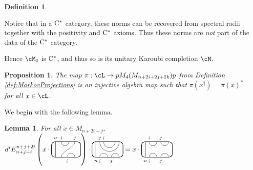 \documentclass[11pt]{article}
\theoremstyle{plain}
\newtheorem{lem}[thm]{Lemma}
\newtheorem{prop}[thm]{Proposition}
\theoremstyle{definition}
\newtheorem{defn}[thm]{Definition}
\newcommand{\Cstar}{\rm{C^*}}
\begin{document}
\begin{defn}
\begin{itemize}
{Notice that in a $\Cstar$ category, these norms can be recovered from spectral radii together with the positivity and $\Cstar$ axioms.
Thus these norms are \emph{not} part of the data of the $\Cstar$ category.
}
\end{itemize}
Hence $\cM_0$ is $\Cstar$, and thus so is its unitary Karoubi completion $\cM$.
\end{defn}


\begin{prop}
\label{prop:InjectiveAlgebraMap}
The map $\pi: \cL \to pM_4(M_{n+2i+2j+2k})p$ from Definition \ref{def:MarkovProjections} is an injective algebra map such that $\pi(x^\dag) = \pi(x)^*$ for all $x\in \cL$.
\end{prop}


We begin with the following lemma.

 \begin{lem}
 \label{lem:LeftKink}
For all $x \in M_{n+2i+j}$,
$
d^i
E^{n+j+2i}_{n+j+i}
\left(
x
\cdot
\begin{tikzpicture}[baseline = .3cm]
 \draw[thick, rounded corners = 5pt] (0,0) rectangle (1.5,.8);
 \draw (.2,0) -- (.2,.8);
 \draw (.5,.8) arc (-180:0:.2cm);
 \draw (.5,0) .. controls ++(90:.3cm) and ++(270:.3cm) .. (1.2,.8);
 \draw (.8,0) arc (180:0:.2cm);
 \node at (.2,1) {\scriptsize{$n$}};
 \node at (.5,1) {\scriptsize{$i$}};
 \node at (1.2,1) {\scriptsize{$j$}};
 \node at (.8,-.2) {\scriptsize{$i$}};
\end{tikzpicture}
\right)
\cdot
\begin{tikzpicture}[baseline=.3cm]
 \draw[thick, rounded corners = 5pt] (0,0) rectangle (1.6,.8);
 \draw (.2,0) -- (.2,.8);
 \draw (0.4,.8) arc (-180:0:.5);
 \draw (0.6,.8) arc (-180:0:.3);
 \draw (0.4,0) arc (180:0:.2);
 \draw (1,0) arc (180:0:.2);
 \node at (.2,-.2) {\scriptsize{$n$}};
 \node at (.4,1) {\scriptsize{$j$}};
 \node at (.6,1) {\scriptsize{$i$}};
 \node at (.4,-.2) {\scriptsize{$i$}};
 \node at (1,-.2) {\scriptsize{$j$}};
\end{tikzpicture}
=
x\cdot
\begin{tikzpicture}[baseline=.3cm]
 \draw[thick, rounded corners = 5pt] (0,0) rectangle (1.6,.8);
 \draw (.2,0) -- (.2,.8);
 \draw (0.4,0) arc (180:0:.2);
 \draw (1,0) arc (180:0:.2);
 \draw (0.4,.8) arc (-180:0:.2);
 \draw (1,.8) arc (-180:0:.2);
 \node at (.2,-.2) {\scriptsize{$n$}};
 \node at (.4,-.2) {\scriptsize{$i$}};
 \node at (1,-.2) {\scriptsize{$j$}};
 \node at (.4,1) {\scriptsize{$i$}};
 \node at (1,1) {\scriptsize{$j$}};
\end{tikzpicture}
$ 

\end{lem}
\end{document}
